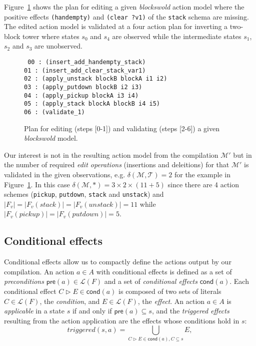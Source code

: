 \documentclass[letterpaper]{article} %
\newcommand{\pre}{\mathsf{pre}}     %
\newcommand{\cond}{\mathsf{cond}}   %
\begin{document}
Figure~\ref{fig:plan-pdistance} shows the plan for editing a given {\em blockswold} action model where the positive effects {\tt\small (handempty)} and {\tt\small (clear ?v1)} of the {\tt\small stack} schema are missing. The edited action model is validated at a four action plan for inverting a two-block tower where states $s_0$ and $s_4$ are observed while the intermediate states $s_1$, $s_2$ and $s_3$ are unobserved. 
\begin{figure}
{\tt\scriptsize
00 : (insert\_add\_handempty\_stack)\\
01 : (insert\_add\_clear\_stack\_var1)\\
02 : (apply\_unstack blockB blockA i1 i2)\\
03 : (apply\_putdown blockB i2 i3)\\
04 : (apply\_pickup blockA i3 i4)\\
05 : (apply\_stack blockA blockB i4 i5)\\
06 : (validate\_1)
}
 \caption{\small Plan for editing (steps [0-1]) and validating (steps [2-6]) a given {\em blockswold} model.}
\label{fig:plan-pdistance}
\end{figure}

Our interest is not in the resulting action model from the compilation $\mathcal{M}'$ but in the number of required {\em edit operations} (insertions and deleitions) for that $\mathcal{M}'$ is validated in the given observations, e.g. $\delta(\mathcal{M},\mathcal{T})=2$ for the example in Figure~\ref{fig:plan-pdistance}. In this case $\delta(\mathcal{M},*)=3\times 2\times (11+5)$ since there are 4 action schemes ({\small\tt pickup}, {\small\tt putdown}, {\small\tt stack} and {\small\tt unstack}) and $|F_v|=|F_v(stack)|=|F_v(unstack)|=11$ while $|F_v(pickup)|=|F_v(putdown)|=5$. %

\subsection{Conditional effects}
Conditional effects allow us to compactly define the actions output by our compilation. An action $a\in A$ with conditional effects is defined as a set of {\em preconditions} $\pre(a)\in\mathcal{L}(F)$ and a set of {\em conditional effects} $\cond(a)$. Each conditional effect $C\rhd E\in\cond(a)$ is composed of two sets of literals $C\in\mathcal{L}(F)$, the {\em condition}, and $E\in\mathcal{L}(F)$, the {\em effect}. An action $a\in A$ is {\em applicable} in a state $s$ if and only if $\pre(a)\subseteq s$, and the {\em triggered effects} resulting from the action application are the effects whose conditions hold in $s$:
\[
triggered(s,a)=\bigcup_{C\rhd E\in\cond(a),C\subseteq s} E,
\]
\end{document}
